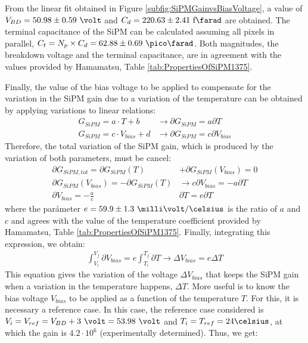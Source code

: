 From the linear fit obtained in Figure \ref{subfig:SiPMGainvsBiasVoltage}, a value of $V_{BD}=50.98 \pm 0.59~\volt$ and $C_d{}= 220.63 \pm 2.41~\text{f}\farad$ are obtained. The terminal capacitance of the SiPM can be calculated assuming all pixels in parallel, $C_{t}=N_{p}\times C_{d}=62.88 \pm 0.69~\pico\farad$. Both magnitudes, the breakdown voltage and the terminal capacitance, are in agreement with the values provided by Hamamatsu, Table \ref{tab:PropertiesOfSiPM1375}. 

Finally, the value of the bias voltage to be applied to compensate for the variation in the SiPM gain due to a variation of the temperature can be obtained by applying variations to linear relations:
\begin{equation*}
\begin{split}
G_{SiPM}=a \cdot{} T + b  &\longrightarrow \partial G_{SiPM}= a \partial T\\
G_{SiPM}=c \cdot{} V_{bias} + d &\longrightarrow \partial G_{SiPM}= c \partial V_{bias}
\label{Gain_compensationVariations}
\end{split}
\end{equation*} 
Therefore, the total variation of the SiPM gain, which is produced by the variation of both parameters, must be cancel:
\begin{equation*}
\begin{split}
\partial G_{SiPM, tot}= \partial G_{SiPM}(T) &+ \partial G_{SiPM}(V_{bias}) = 0\\ 
\partial G_{SiPM}(V_{bias}) = -\partial G_{SiPM}(T) &\longrightarrow c \partial V_{bias} = - a \partial T\\ 
\partial V_{bias}  = - \frac{a}{c}&\partial T = e \partial T
\label{Gain_compensation0}
\end{split}
\end{equation*} 
where the parámeter $e= 59.9 \pm 1.3~\milli\volt/\celsius $ is the ratio of $a$ and $c$ and agrees with the value of the temperature coefficient provided by Hamamatsu, Table \ref{tab:PropertiesOfSiPM1375}. Finally, integrating this expression, we obtain:
\begin{equation}
\begin{split}
\int_{V_i}^{V_f}\partial V_{bias}  = e\int_{T_i}^{T_f}\partial T \longrightarrow \Delta V_{bias} = e \Delta T
\label{Gain_compensationIntegring}
\end{split}
\end{equation} 
This equation gives the variation of the voltage $\Delta V_{bias}$ that keeps the SiPM gain when a variation in the temperature happens, $\Delta T$. More useful is to know the bias voltage $V_{bias}$ to be applied as a function of the temperature $T$. For this, it is necessary a reference case. In this case, the reference case considered is $V_i=V_{ref}= V_{BD}+3~\volt = 53.98~\volt$ and $T_i=T_{ref}=24\celsius$, at which the gain is $4.2 \cdot{} 10^{6}$ (experimentally determined). Thus, we get:
